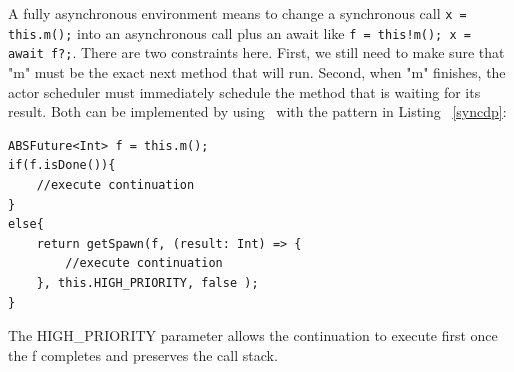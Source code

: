 \par A fully asynchronous environment means to change a synchronous call \texttt{x = this.m();} into an asynchronous call plus an await like \texttt{f = this!m(); x = await f?;}. There are two constraints here. First, we still need to make sure that "m" must be the exact next method that will run. Second, when "m" finishes, the actor scheduler must immediately schedule the method that is waiting for its result. Both can be implemented by using \gspawn ~with the pattern in Listing ~\ref{syncdp}:

\begin{lstlisting}[caption= Synchronous Call Pattern, label=syncdp]
ABSFuture<Int> f = this.m();
if(f.isDone()){
	//execute continuation
}
else{
	return getSpawn(f, (result: Int) => {
		//execute continuation
	}, this.HIGH_PRIORITY, false );
}
\end{lstlisting}
The HIGH\_PRIORITY parameter allows the continuation to execute first once the \future f completes and preserves the call stack.




